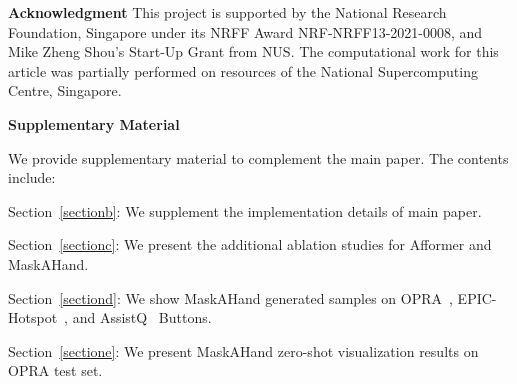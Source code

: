 \documentclass[10pt,twocolumn,letterpaper]{article}
\begin{document}
{\vspace{2mm}
\noindent\textbf{\large{Acknowledgment}} \quad
This project is supported by the National Research Foundation, Singapore under its NRFF Award NRF-NRFF13-2021-0008, and Mike Zheng Shou’s Start-Up Grant from NUS. The computational work for this article was partially performed on resources of the National Supercomputing Centre, Singapore.

{\small


}

\clearpage

\noindent\large{\textbf{Supplementary Material}}
\vspace{1mm}

We provide supplementary material to complement the main paper. The contents include:

 Section~\ref{sectionb}: We supplement the implementation details of main paper. 

 Section~\ref{sectionc}: We present the additional ablation studies for Afformer and MaskAHand.

 Section~\ref{sectiond}: We show MaskAHand generated samples on OPRA~\cite{demo2vec}, EPIC-Hotspot~\cite{hotspot}, and AssistQ~\cite{assistq} Buttons.

 Section~\ref{sectione}: We present MaskAHand zero-shot visualization results on OPRA test set.

}
\end{document}
